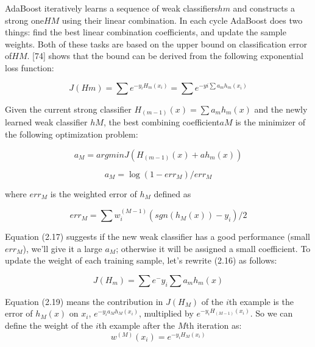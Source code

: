 \documentclass[12pt, twoside]{report}
\begin{document}
	\par
	AdaBoost iteratively learns a sequence of weak classifiers$ hm$ and constructs a strong one$
	HM$ using their linear combination. In each cycle AdaBoost does two things: find the best
	linear combination coefficients, and update the sample weights. Both of these tasks are
	based on the upper bound on classification error of$ HM$. [74] shows that the bound can be
	derived from the following exponential loss function:
	
	\begin{equation}
	J(Hm)=\sum  e^{-y_iH_m(x_i)} =\sum e^{-yi \sum a_m h_m(x_i)} 
	\end{equation}
	
	Given the current strong classifier $H_(m-1)(x)=\sum a_m h_m (x)$ and the newly learned
	weak classifier $hM$, the best combining coefficient$ aM$ is the minimizer of the following
	optimization problem:
	
	\begin{equation}
	a_M = argminJ(H_(m-1)(x)+ah_m(x))
	\end{equation}
	
	\begin{equation}
	a_M=\log (1-err_M ) /err_M  
	\end{equation}
	
	where $err_M$ is the weighted error of $h_M$ defined as
	
	\begin{equation}
	err_M=\sum w_i^(M-1)(sgn(h_M(x))-y_i)/2
	\end{equation}
	
	Equation (2.17) suggests if the new weak classifier has a good performance (small $err_M$),
	we’ll give it a large $a_M$; otherwise it will be assigned a small coefficient.
	To update the weight of each training sample, let’s rewrite (2.16) as follows:
	
	\begin{equation}
	J(H_m)=\sum e^-y_i \sum a_m h_m (x)
	\end{equation}
	
	\newpage
	\par
	Equation (2.19) means the contribution in $J(H_M)$ of the $i$th example is the error of $h_M(x)$ on $x_i$, $e^{-y_ia_Mh_M(x_i)}$, multiplied by $e^{-y_iH_{(M-1)}(x_i)}$. So we can define the weight of the $i$th example after the $M$th iteration as:
	\begin{equation}
		w^{(M)}(x_i) = e^{-y_iH_M(x_i)}
	\end{equation}
\end{document}
